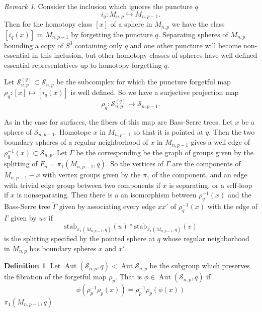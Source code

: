 \documentclass[11pt]{article}
\DeclareMathOperator{\aaut}{Aut}
\newtheorem{lemma}[theorem]{Lemma}
\theoremstyle{remark}
\newtheorem{remark}[theorem]{Remark}
\theoremstyle{definition}
\newtheorem{definition}[theorem]{Definition}
\begin{document}
\begin{remark}
  Consider the inclusion which ignores the puncture $q$
  $$i_q: M_{n,p} \hookrightarrow M_{n,p-1}.$$
  Then for the homotopy class $[x]$ of a sphere
  in $M_{n,p}$ we have the class $[i_q(x)]$ in $M_{n,p-1}$
  by forgetting the puncture $q$.
  Separating spheres of $M_{n,p}$ bounding a copy of $S^3$ containing only $q$ and one other puncture
  will become non-essential in this inclusion,
  but other homotopy classes of spheres have well defined
  essential representatives up to homotopy forgetting $q$.

  Let $\mathcal S_{n,p}^{(q)} \subset \mathcal S_{n,p}$
  be the subcomplex for which the puncture forgetful map
  $\rho_q: [x] \mapsto [i_q(x)]$ is well defined.
  So we have a surjective projection map
  $$
  \rho_q: \mathcal S_{n,p}^{(q)} \to \mathcal S_{n,p-1}.
  $$

As in the case for surfaces, the fibers of this map are Bass-Serre trees.
Let $x$ be a sphere of $\mathcal S_{n,p-1}$.
Homotope $x$ in $M_{n,p-1}$ so that it is pointed at $q$.
Then the two boundary  spheres of a regular neighborhood of $x$ in $M_{n,p-1}$ gives a well edge of $\rho^{-1}_q(x) \subset \mathcal S_{n,p}$.
Let $\Gamma$ be the corresponding
be the graph of groups given by the splitting of $F_n=\pi_1(M_{n,p-1},q)$.
So the vertices of $\Gamma$ are the components of
$M_{n,p-1}-x$ with vertex groups given by the $\pi_1$ of the component,
and an edge with trivial edge group between two components if $x$ is separating, or a self-loop if $x$ is nonseparating.
Then there is a an isomorphism between
$\rho_q^{-1}(x)$ and the Bass-Serre tree $\tilde \Gamma$
given by associating every edge $xx'$ of $\rho_q^{-1}(x)$
with the edge of $\Gamma$ given by $uv$
if
$$
\mbox{stab}_{\pi_1(M_{n,p-1},q)}(u)
\ast
\mbox{stab}_{\pi_1(M_{n,p-1},q)}(v)
$$
is the splitting specified
by the pointed sphere at $q$ whose regular neighborhood in $M_{n,p}$ has boundary spheres
$x$ and $x'$.
\end{remark}


\begin{definition}
  Let $\aaut(\mathcal S_{n,p},q) < \aaut \mathcal S_{n,p}$
  be the subgroup which preserves the fibration of
  the forgetful map $\rho_p$.
  That is $\phi \in \aaut(\mathcal S_{n,p},q)$
  if
  $$
  \phi \left( \rho_p^{-1}\rho_p(x) \right)
  =
  \rho_p^{-1}\rho_p( \phi(x))
  $$
  $\pi_1(M_{n,p-1},q)$
\end{definition}
\end{document}
